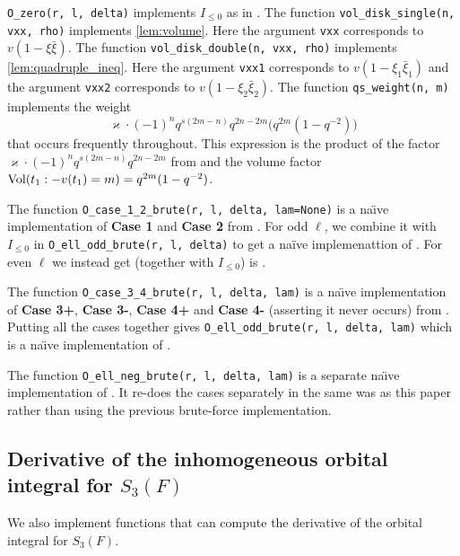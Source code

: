 \begin{itemize}
  \ii \texttt{O\_zero(r, l, delta)} implements $I_{\le 0}$ as in .
  \ii The function \texttt{vol\_disk\_single(n, vxx, rho)} implements \cref{lem:volume}.
  Here the argument \texttt{vxx} corresponds to $v(1 - \xi \bar \xi)$.
  \ii The function \texttt{vol\_disk\_double(n, vxx, rho)} implements \cref{lem:quadruple_ineq}.
  Here the argument \texttt{vxx1} corresponds to $v(1 - \xi_1 \bar \xi_1)$
  and the argument \texttt{vxx2} corresponds to $v(1 - \xi_2 \bar \xi_2)$.
  \ii The function \texttt{qs\_weight(n, m)} implements the weight
  \[ \varkappa \cdot (-1)^n q^{s(2m-n)} q^{2n-2m} \Big( q^{2m}(1-q^{-2}) \Big) \]
  that occurs frequently throughout.
  This expression is the product of the factor
  $\varkappa \cdot (-1)^n q^{s(2m-n)} q^{2n-2m}$ from 
  and the volume factor $\operatorname{Vol}(t_1: -v(t_1)=m) = q^{2m} (1-q^{-2})$.

  \ii The function \texttt{O\_case\_1\_2\_brute(r, l, delta, lam=None)}
  is a na\"{\i}ve implementation of \textbf{Case 1} and \textbf{Case 2}
  from .
  For odd $\ell$, we combine it with $I_{\le 0}$ in \texttt{O\_ell\_odd\_brute(r, l, delta)}
  to get a na\"{i}ve implemenattion of .
  For even $\ell$ we instead get (together with $I_{\le 0}$) is .

  \ii The function \texttt{O\_case\_3\_4\_brute(r, l, delta, lam)}
  is a na\"{\i}ve implementation of
  \textbf{Case 3\ts+}, \textbf{Case 3\ts-}, \textbf{Case 4\ts+}
  and \textbf{Case 4\ts-} (asserting it never occurs)
  from .
  Putting all the cases together gives
  \texttt{O\_ell\_odd\_brute(r, l, delta, lam)}
  which is a na\"{\i}ve implementation of .

  \ii The function \texttt{O\_ell\_neg\_brute(r, l, delta, lam)}
  is a separate na\"{\i}ve implementation of .
  It re-does the cases separately in the same was as this paper
  rather than using the previous brute-force implementation.
\end{itemize}

\subsection{Derivative of the inhomogeneous orbital integral for $S_3(F)$}
We also implement functions that can compute the
derivative of the orbital integral for $S_3(F)$.

